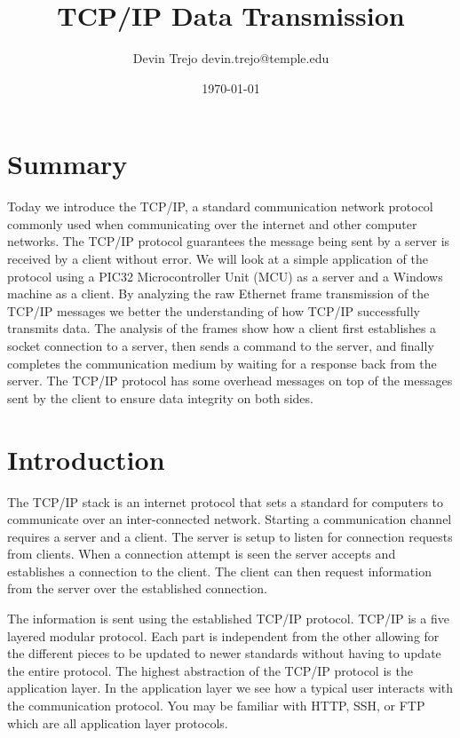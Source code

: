 \documentclass[12pt]{article}
\begin{document}
\title{TCP/IP Data Transmission}
\author{Devin Trejo \tabularnewline devin.trejo@temple.edu }
\date{\today}
\maketitle

\section{Summary}
Today we introduce the TCP/IP, a standard communication network protocol 
commonly used when communicating over the internet and other computer 
networks. The TCP/IP protocol guarantees the message being sent by a server 
is received by a client without error. We will look at a simple application
of the protocol using a PIC32 Microcontroller Unit (MCU) as a server and 
a Windows machine as a client. By analyzing the raw Ethernet frame 
transmission of the TCP/IP messages we better the understanding of how 
TCP/IP successfully transmits data. The analysis of the frames show how 
a client first establishes a socket connection to a server, then sends a 
command to the server, and finally completes the communication medium by 
waiting for a response back from the server. The TCP/IP protocol has some 
overhead messages on top of the messages sent by the client to ensure data 
integrity on both sides.  

\section{Introduction}
The TCP/IP stack is an internet protocol that sets a standard for computers
to communicate over an inter-connected network. Starting a communication 
channel requires a server and a client. The server is setup to listen for 
connection requests from clients. When a connection attempt is seen the 
server accepts and establishes a connection to the client. The client can 
then request information from the server over the established connection.

The information is sent using the established TCP/IP protocol. TCP/IP is a 
five layered modular protocol. Each part is independent from the other 
allowing for the different pieces to be updated to newer standards without 
having to update the entire protocol. The highest abstraction of the TCP/IP 
protocol is the application layer. In the application layer we see how a 
typical user interacts with the communication protocol. You may be familiar 
with HTTP, SSH, or FTP which are all application layer protocols. 
\end{document}

